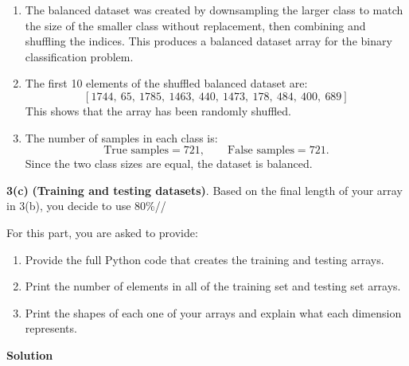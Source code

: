 \documentclass[11pt]{article}
\begin{document}
	\begin{enumerate}[label=\roman*.]
		
		\item The balanced dataset was created by downsampling the larger class to match the size of the smaller class without replacement, then combining and shuffling the indices. This produces a balanced dataset array for the binary classification problem.
		
		\item The first 10 elements of the shuffled balanced dataset are:
		\[
		[1744,\ 65,\ 1785,\ 1463,\ 440,\ 1473,\ 178,\ 484,\ 400,\ 689]
		\]
		This shows that the array has been randomly shuffled.
		
		\item The number of samples in each class is:
		\[
		\text{True samples} = 721, \qquad \text{False samples} = 721.
		\]
		Since the two class sizes are equal, the dataset is balanced.
		
	\end{enumerate}
	
	\textbf{3(c)} \textbf{(Training and testing datasets)}. Based on the final length of your array in 3(b), you decide to use 80\%//
	
	For this part, you are asked to provide:
	
	\begin{enumerate}[label=\roman*.]
		\item Provide the full Python code that creates the training and testing arrays.
		
		\item Print the number of elements in all of the training set and testing set arrays.
		
		\item Print the shapes of each one of your arrays and explain what each dimension represents.
	\end{enumerate}
	
	\textbf{Solution}
	
\end{document}
